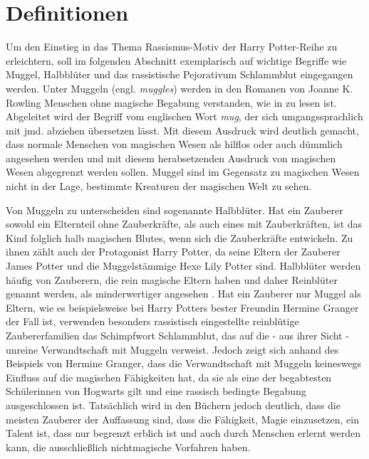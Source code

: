 \section{Definitionen}
Um den Einstieg in das Thema \glqq Rassismus-Motiv der  \glq Harry Potter\grq-Reihe\grqq{} zu erleichtern, soll im folgenden Abschnitt exemplarisch auf wichtige Begriffe wie \glqq Muggel\grqq, \glqq Halbblüter\grqq{} und das rassistische Pejorativum \glqq Schlammblut\grqq{} eingegangen werden.
Unter \glqq Muggeln\grqq{} (engl. \emph{muggles}) werden in den Romanen von Joanne K. Rowling Menschen ohne magische Begabung verstanden, wie in \cite[S. \,61]{JKR97} zu lesen ist. 
Abgeleitet wird der Begriff vom englischen Wort \emph{mug}, der sich umgangssprachlich mit \glqq jmd. abziehen\grqq{} übersetzen lässt. 
Mit diesem Ausdruck wird deutlich gemacht, dass \glqq normale\grqq{} Menschen von magischen Wesen als hilflos oder auch dümmlich angesehen werden und mit diesem herabsetzenden Ausdruck von magischen Wesen abgegrenzt werden sollen.
Muggel sind im Gegensatz zu magischen Wesen nicht in der Lage, bestimmte Kreaturen der magischen Welt zu sehen.

Von Muggeln zu unterscheiden sind sogenannte \glqq Halbblüter\grqq. 
Hat ein Zauberer sowohl ein Elternteil ohne Zauberkräfte, als auch eines mit Zauberkräften, ist das Kind folglich halb magischen \glqq Blutes\grqq, wenn sich die Zauberkräfte entwickeln. 
Zu ihnen zählt auch der Protagonist Harry Potter, da seine Eltern der Zauberer James Potter und die Muggelstämmige Hexe Lily Potter sind.
Halbblüter werden häufig von Zauberern, die rein magische Eltern haben und daher \glqq Reinblüter\grqq{} genannt werden, als minderwertiger angesehen \cite[S.\,220]{JKR03}. 
Hat ein Zauberer nur Muggel als Eltern, wie es beispielsweise bei Harry Potters bester Freundin Hermine Granger der Fall ist, verwenden besonders rassistisch eingestellte reinblütige Zaubererfamilien das Schimpfwort \glqq Schlammblut\grqq, das auf die - aus ihrer Sicht -  \glqq unreine\grqq{} Verwandtschaft mit Muggeln verweist.
Jedoch zeigt sich anhand des Beispiels von Hermine Granger, dass die Verwandtschaft mit Muggeln keineswegs Einfluss auf die magischen Fähigkeiten hat, da sie als eine der begabtesten Schülerinnen von Hogwarts gilt und eine rassisch bedingte Begabung ausgeschlossen ist.
Tatsächlich wird in den Büchern jedoch deutlich, dass die meisten Zauberer der Auffassung sind, dass die Fähigkeit, Magie einzusetzen, ein Talent ist, dass nur begrenzt erblich ist und auch durch Menschen erlernt werden kann, die ausschließlich nichtmagische Vorfahren haben. 

